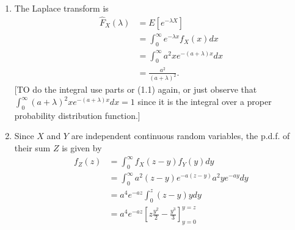 \documentclass[11pt,a4paper]{article}
\begin{document}
\begin{enumerate}
\begin{enumerate}
\begin{align*}
        &= \frac{2}{a}.
      \end{align*}
      [To do the integral either integrate by parts or use (1.1) with $n = 3$]\\
      A similar integration yields
      \begin{align*}
        E[X^2]
        &= \int_0^\infty x^2f_X(x)dx\\
        &= \int_0^\infty a^2x^3e^{-ax}dx\\
        &= \frac{6}{a^2},
      \end{align*}
      and hence the variance
      \begin{align*}
        \sigma^2
        &= E[X^2] - \mu^2\\
        &= \frac{6}{a^2}-\left(\frac{2}{a}\right)\\
        &= \frac{2}{a^2}.
      \end{align*}
      Note that the question means "find" in the sense of calculate, not merely in the sense of look-up somewhere! Of course, one can also obtain the moments by calculating the moment generating function but that is not actually necessary for this part of the question, and is essentially equivalent to calculating the Laplace transform in (c). [Why?]
      \item The Laplace transform is
      \begin{align*}
        \hat{F}_X(\lambda)
        &= E[e^{-\lambda X}]\\
        &= \int_0^\infty e^{-\lambda x}f_X(x)dx\\
        &= \int_0^\infty a^2xe^{-(a + \lambda)x}dx\\
        &= \frac{a^2}{(a + \lambda)^2}.
      \end{align*}
      [TO do the integral use parts or (1.1) again, or just observe that $\int_0^\infty(a + \lambda)^2\allowbreak xe^{-(a + \lambda)x}dx = 1$ since it is the integral over a proper probability distribution function.]
      \item Since $X$ and $Y$ are independent continuous random variables, the p.d.f. of their sum $Z$ is given by
      \begin{align*}
        f_Z(z)
        &= \int_0^\infty f_X(z - y)f_Y(y)dy\\
        &= \int_0^\infty a^2(z - y)e^{-a(z - y)}a^2ye^{-ay}dy\\
        &= a^4e^{-az}\int_0^z(z - y)ydy\\
        &= a^4e^{-az}\left[z\frac{y^2}{2} - \frac{y^3}{3}\right]_{y = 0}^{y = z}\\

\end{align*}
\end{enumerate}
\end{enumerate}
\end{document}
